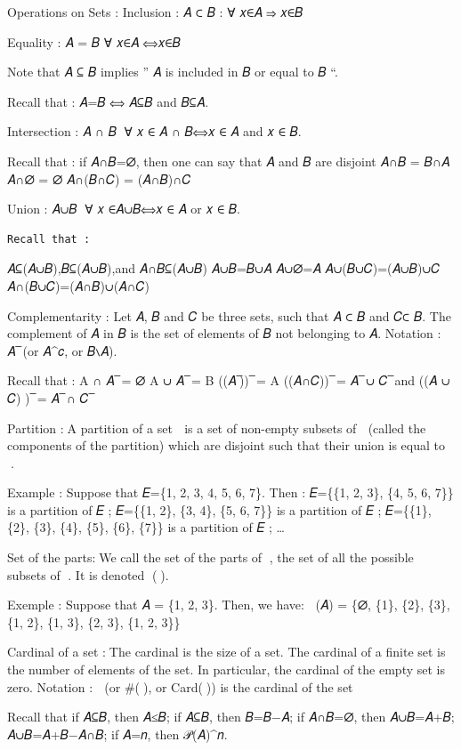 \documentclass[
  letterpaper,
  DIV=11,
  numbers=noendperiod]{scrreprt}
\begin{document}
Operations on Sets : Inclusion : 𝐴 ⊂ 𝐵 : ∀ 𝑥∈𝐴 ⇒ 𝑥∈𝐵

Equality : 𝐴 = 𝐵 ∀ 𝑥∈𝐴 ⟺𝑥∈𝐵

Note that 𝐴 ⊆ 𝐵 implies '' 𝐴 is included in 𝐵 or equal to 𝐵 ``.

Recall that : 𝐴=𝐵 ⟺ 𝐴⊆𝐵 and 𝐵⊆𝐴.

Intersection : 𝐴 ∩ 𝐵 ∀ 𝑥 ∈ 𝐴 ∩ 𝐵⟺𝑥 ∈ 𝐴 and 𝑥 ∈ 𝐵.

Recall that : if 𝐴∩𝐵=∅, then one can say that 𝐴 and 𝐵 are disjoint 𝐴∩𝐵 =
𝐵∩𝐴 𝐴∩∅ = ∅ 𝐴∩(𝐵∩𝐶) = (𝐴∩𝐵)∩𝐶

Union : 𝐴∪𝐵 ∀ 𝑥 ∈𝐴∪𝐵⟺𝑥 ∈ 𝐴 or 𝑥 ∈ 𝐵.

\begin{verbatim}
Recall that :
\end{verbatim}

𝐴⊆(𝐴∪𝐵),𝐵⊆(𝐴∪𝐵),and 𝐴∩𝐵⊆(𝐴∪𝐵) 𝐴∪𝐵=𝐵∪𝐴 𝐴∪∅=𝐴 𝐴∪(𝐵∪𝐶)=(𝐴∪𝐵)∪𝐶
𝐴∩(𝐵∪𝐶)=(𝐴∩𝐵)∪(𝐴∩𝐶)

Complementarity : Let 𝐴, 𝐵 and 𝐶 be three sets, such that 𝐴 ⊂ 𝐵 and 𝐶⊂
𝐵. The complement of 𝐴 in 𝐵 is the set of elements of 𝐵 not belonging to
𝐴. Notation : 𝐴~̅ (or 𝐴\^{}𝑐, or 𝐵∖𝐴).

Recall that : A ∩ 𝐴~̅ = ∅ A ∪ 𝐴~̅ = B ((𝐴~̅))~̅ = A ((𝐴∩𝐶))~̅ = 𝐴~̅ ∪ 𝐶~̅ and
((𝐴 ∪ 𝐶) )~̅ = 𝐴~̅ ∩ 𝐶~̅

Partition :A partition of a set 𝐸 is a set of non-empty subsets of 𝐸
(called the components of the partition) which are disjoint such that
their union is equal to 𝐸.

Example : Suppose that 𝐸=\{1, 2, 3, 4, 5, 6, 7\}. Then : 𝐸=\{\{1, 2,
3\}, \{4, 5, 6, 7\}\} is a partition of 𝐸 ; 𝐸=\{\{1, 2\}, \{3, 4\}, \{5,
6, 7\}\} is a partition of 𝐸 ; 𝐸=\{\{1\}, \{2\}, \{3\}, \{4\}, \{5\},
\{6\}, \{7\}\} is a partition of 𝐸 ; \ldots{}

Set of the parts:We call the set of the parts of 𝐴, the set of all the
possible subsets of 𝐴. It is denoted 𝒫(𝐴).

Exemple : Suppose that 𝐴 = \{1, 2, 3\}. Then, we have: 𝒫(𝐴) = \{∅,
\{1\}, \{2\}, \{3\}, \{1, 2\}, \{1, 3\}, \{2, 3\}, \{1, 2, 3\}\}

Cardinal of a set :The cardinal is the size of a set. The cardinal of a
finite set is the number of elements of the set. In particular, the
cardinal of the empty set is zero. Notation : \textbar 𝐸\textbar{} (or
\#(𝐸), or Card(𝐸)) is the cardinal of the set 𝐸

Recall that if 𝐴⊆𝐵, then \textbar 𝐴\textbar≤\textbar 𝐵\textbar; if 𝐴⊆𝐵,
then \textbar 𝐵\A\textbar=\textbar 𝐵\textbar−\textbar 𝐴\textbar; if
𝐴∩𝐵=∅, then \textbar 𝐴∪𝐵\textbar=\textbar 𝐴\textbar+\textbar 𝐵\textbar;
\textbar 𝐴∪𝐵\textbar=\textbar 𝐴\textbar+\textbar 𝐵\textbar−\textbar 𝐴∩𝐵\textbar;
if \textbar 𝐴\textbar=𝑛, then \textbar 𝒫(𝐴)\^{}𝑛.
\end{document}
